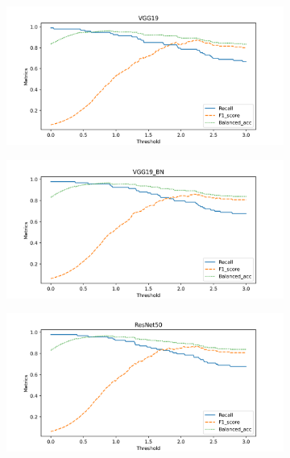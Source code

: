 \begin{figure}[!ht]
    \centering
    \begin{subfigure}{0.48\textwidth}
        \centering
        \includegraphics[width=\textwidth]{./results/comparison/VGG19_threshold.png}
    \end{subfigure}
    \begin{subfigure}{0.48\textwidth}
        \centering
        \includegraphics[width=\textwidth]{./results/comparison/VGG19_BN_threshold.png}
    \end{subfigure}
    \begin{subfigure}{0.48\textwidth}
        \centering
        \includegraphics[width=\textwidth]{./results/comparison/ResNet50_threshold.png}

\end{subfigure}
\end{figure}
